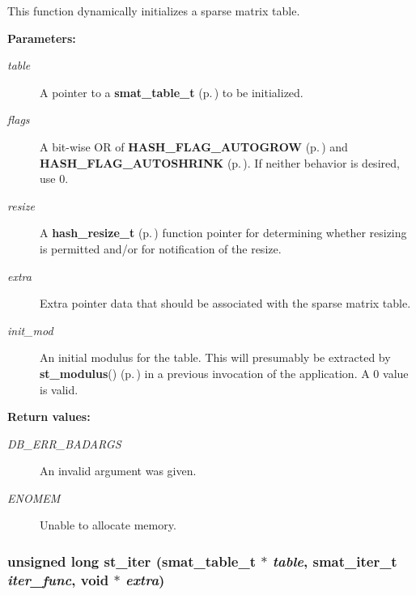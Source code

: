 This function dynamically initializes a sparse matrix table.\begin{Desc}
\item[{\bf Parameters: }]\par
\begin{description}
\item[
{\em table}]A pointer to a {\bf smat\_\-table\_\-t} {\rm (p.\,\pageref{group__dbprim__smat_a0})} to be initialized. \item[
{\em flags}]A bit-wise OR of {\bf HASH\_\-FLAG\_\-AUTOGROW} {\rm (p.\,\pageref{group__dbprim__hash_a16})} and {\bf HASH\_\-FLAG\_\-AUTOSHRINK} {\rm (p.\,\pageref{group__dbprim__hash_a17})}. If neither behavior is desired, use 0. \item[
{\em resize}]A {\bf hash\_\-resize\_\-t} {\rm (p.\,\pageref{group__dbprim__hash_a5})} function pointer for determining whether resizing is permitted and/or for notification of the resize. \item[
{\em extra}]Extra pointer data that should be associated with the sparse matrix table. \item[
{\em init\_\-mod}]An initial modulus for the table. This will presumably be extracted by {\bf st\_\-modulus}() {\rm (p.\,\pageref{group__dbprim__smat_a25})} in a previous invocation of the application. A 0 value is valid.\end{description}
\end{Desc}
\begin{Desc}
\item[{\bf Return values: }]\par
\begin{description}
\item[
{\em DB\_\-ERR\_\-BADARGS}]An invalid argument was given. \item[
{\em ENOMEM}]Unable to allocate memory. \end{description}
\end{Desc}
\subsubsection{\setlength{\rightskip}{0pt plus 5cm}unsigned long st\_\-iter ({\bf smat\_\-table\_\-t} $\ast$ {\em table}, {\bf smat\_\-iter\_\-t} {\em iter\_\-func}, void $\ast$ {\em extra})}\label{group__dbprim__smat_a13}




